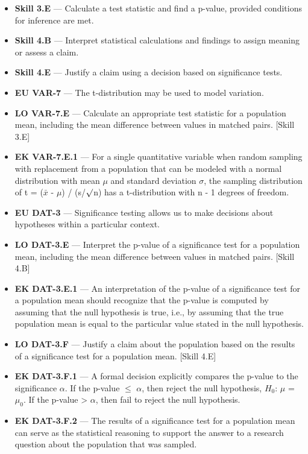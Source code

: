\documentclass[11pt]{article}
\begin{document}


{\small
\begin{itemize}[leftmargin=1.5em,itemsep=2pt,topsep=2pt]
  \item \textbf{Skill 3.E} --- Calculate a test statistic and find a p-value, provided conditions for inference are met.
  \item \textbf{Skill 4.B} --- Interpret statistical calculations and findings to assign meaning or assess a claim.
  \item \textbf{Skill 4.E} --- Justify a claim using a decision based on significance tests.
  \item \textbf{EU VAR-7} --- The t-distribution may be used to model variation.
  \item \textbf{LO VAR-7.E} --- Calculate an appropriate test statistic for a population mean, including the mean difference between values in matched pairs. [Skill 3.E]
  \item \textbf{EK VAR-7.E.1} --- For a single quantitative variable when random sampling with replacement from a population that can be modeled with a normal distribution with mean $\mu$ and standard deviation $\sigma$, the sampling distribution of t = ($\bar{x}$ - $\mu$) / (s/$\surd$n) has a t-distribution with n - 1 degrees of freedom.
  \item \textbf{EU DAT-3} --- Significance testing allows us to make decisions about hypotheses within a particular context.
  \item \textbf{LO DAT-3.E} --- Interpret the p-value of a significance test for a population mean, including the mean difference between values in matched pairs. [Skill 4.B]
  \item \textbf{EK DAT-3.E.1} --- An interpretation of the p-value of a significance test for a population mean should recognize that the p-value is computed by assuming that the null hypothesis is true, i.e., by assuming that the true population mean is equal to the particular value stated in the null hypothesis.
  \item \textbf{LO DAT-3.F} --- Justify a claim about the population based on the results of a significance test for a population mean. [Skill 4.E]
  \item \textbf{EK DAT-3.F.1} --- A formal decision explicitly compares the p-value to the significance $\alpha$. If the p-value $\leq$ $\alpha$, then reject the null hypothesis, $H_0$: $\mu$ = $\mu_0$. If the p-value > $\alpha$, then fail to reject the null hypothesis.
  \item \textbf{EK DAT-3.F.2} --- The results of a significance test for a population mean can serve as the statistical reasoning to support the answer to a research question about the population that was sampled.
\end{itemize}
}
\end{document}
